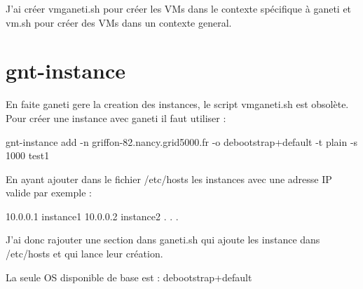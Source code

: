 J'ai créer vmganeti.sh pour créer les VMs dans le contexte spécifique à ganeti et vm.sh pour créer des VMs dans un contexte general.

\section {gnt-instance}

En faite ganeti gere la creation des instances, le script vmganeti.sh est obsolète.
Pour créer une instance avec ganeti il faut utiliser : 

gnt-instance add -n griffon-82.nancy.grid5000.fr -o debootstrap+default -t plain -s 1000 test1

En ayant ajouter dans le fichier /etc/hosts les instances avec une adresse IP valide par exemple :

10.0.0.1 instance1
10.0.0.2 instance2
.
.
.

J'ai donc rajouter une section dans ganeti.sh qui ajoute les instance dans /etc/hosts et qui lance leur création.

La seule OS disponible de base est : debootstrap+default


